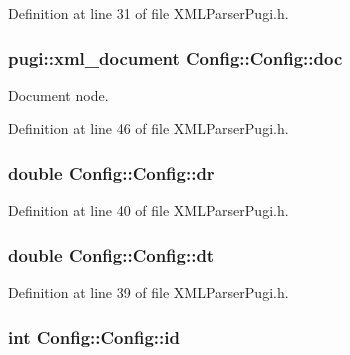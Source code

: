 Definition at line 31 of file XMLParserPugi.h.

\hypertarget{classConfig_1_1Config_a61dfb08aaa9e051084d7c94cbe2d23b5}{
\subsubsection[{doc}]{\setlength{\rightskip}{0pt plus 5cm}pugi::xml\_\-document {\bf Config::Config::doc}}}
\label{classConfig_1_1Config_a61dfb08aaa9e051084d7c94cbe2d23b5}


Document node. 



Definition at line 46 of file XMLParserPugi.h.

\hypertarget{classConfig_1_1Config_ab116322f18f71b98be1ab00413edc400}{
\subsubsection[{dr}]{\setlength{\rightskip}{0pt plus 5cm}double {\bf Config::Config::dr}}}
\label{classConfig_1_1Config_ab116322f18f71b98be1ab00413edc400}


Definition at line 40 of file XMLParserPugi.h.

\hypertarget{classConfig_1_1Config_a37c6fb687d364836452dc746be9bc0cb}{
\subsubsection[{dt}]{\setlength{\rightskip}{0pt plus 5cm}double {\bf Config::Config::dt}}}
\label{classConfig_1_1Config_a37c6fb687d364836452dc746be9bc0cb}


Definition at line 39 of file XMLParserPugi.h.

\hypertarget{classConfig_1_1Config_ae54078b2b14014b3b1bba13fc9aa2fa9}{
\subsubsection[{id}]{\setlength{\rightskip}{0pt plus 5cm}int {\bf Config::Config::id}}}
\label{classConfig_1_1Config_ae54078b2b14014b3b1bba13fc9aa2fa9}


